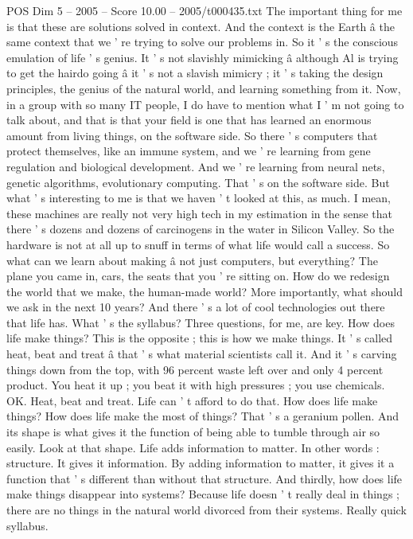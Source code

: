 \begin{textsample}{POS Dim 5 – 2005 – Score 10.00 – 2005/t000435.txt}
The important thing for me is that these are solutions solved in context.
And the context is the Earth â the same context that we ' re trying to solve our problems in.
So it ' s the conscious emulation of life ' s genius.
It ' s not slavishly mimicking â although Al is trying to get the hairdo going â it ' s not a slavish mimicry ; it ' s taking the design principles, the genius of the natural world, and learning something from it.
Now, in a group with so many IT people, I do have to mention what I ' m not going to talk about, and that is that your field is one that has learned an enormous amount from living things, on the software side.
So there ' s computers that protect themselves, like an immune system, and we ' re learning from gene regulation and biological development.
And we ' re learning from neural nets, genetic algorithms, evolutionary computing.
That ' s on the software side.
But what ' s interesting to me is that we haven ' t looked at this, as much.
I mean, these machines are really not very high tech in my estimation in the sense that there ' s dozens and dozens of carcinogens in the water in Silicon Valley.
So the hardware is not at all up to snuff in terms of what life would call a success.
So what can we learn about making â not just computers, but everything?
The plane you came in, cars, the seats that you ' re sitting on.
How do we redesign the world that we make, the human-made world?
More importantly, what should we ask in the next 10 years?
And there ' s a lot of cool technologies out there that life has.
What ' s the syllabus?
Three questions, for me, are key.
How does life make things?
This is the opposite ; this is how we make things.
It ' s called heat, beat and treat â that ' s what material scientists call it.
And it ' s carving things down from the top, with 96 percent waste left over and only 4 percent product.
You heat it up ; you beat it with high pressures ; you use chemicals.
OK.
Heat, beat and treat.
Life can ' t afford to do that.
How does life make things?
How does life make the most of things?
That ' s a geranium pollen.
And its shape is what gives it the function of being able to tumble through air so easily.
Look at that shape.
Life adds information to matter.
In other words : structure.
It gives it information.
By adding information to matter, it gives it a function that ' s different than without that structure.
And thirdly, how does life make things disappear into systems?
Because life doesn ' t really deal in things ; there are no things in the natural world divorced from their systems.
Really quick syllabus.

\end{textsample}
